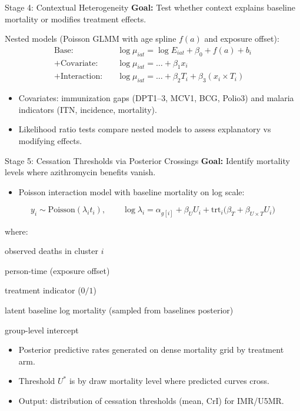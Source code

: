 \documentclass[aspectratio=169]{beamer}\usepackage[]{graphicx}\usepackage[dvipsnames]{xcolor}
\begin{document}
\begin{frame}{Stage 4: Contextual Heterogeneity}
\textbf{Goal:} Test whether context explains baseline mortality or modifies treatment effects.

Nested models (Poisson GLMM with age spline $f(a)$ and exposure offset):
\begin{align*}
  \text{Base:} &\quad \log \mu_{iat} = \log E_{iat} + \beta_0 + f(a) + b_i \\
  \text{+Covariate:} &\quad \log \mu_{iat} = \ldots + \beta_1 x_i \\
  \text{+Interaction:} &\quad \log \mu_{iat} = \ldots + \beta_2 T_i + \beta_3 (x_i \times T_i)
\end{align*}

\begin{itemize}
  \item Covariates: immunization gaps (DPT1–3, MCV1, BCG, Polio3) and malaria indicators (ITN, incidence, mortality).
  \item Likelihood ratio tests compare nested models to assess explanatory vs modifying effects.
\end{itemize}
\end{frame}

\begin{frame}{Stage 5: Cessation Thresholds via Posterior Crossings}
\textbf{Goal:} Identify mortality levels where azithromycin benefits vanish.

\begin{itemize}
  \item Poisson interaction model with baseline mortality on log scale:
\end{itemize}

\[
y_i \sim \text{Poisson}(\lambda_i t_i), \qquad
\log \lambda_i = \alpha_{g[i]} + \beta_U U_i + \text{trt}_i\big(\beta_T + \beta_{U\times T} U_i\big)
\]

\noindent where:
\begin{description}[leftmargin=1.5em]
  \item[$y_i$] observed deaths in cluster $i$
  \item[$t_i$] person-time (exposure offset)
  \item[$\text{trt}_i$] treatment indicator ($0/1$)
  \item[$U_i$] latent baseline log mortality (sampled from baselines posterior)
  \item[$\alpha_{g[i]}$] group-level intercept
\end{description}

\begin{itemize}
  \item Posterior predictive rates generated on dense mortality grid by treatment arm.
  \item Threshold $U^*$ is by draw mortality level where predicted curves cross.
  \item Output: distribution of cessation thresholds (mean, CrI) for IMR/U5MR.
\end{itemize}
\end{frame}
\end{document}
